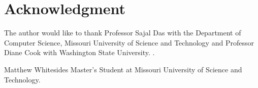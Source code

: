 \documentclass[journal,onecolumn]{IEEEtran}
\begin{document}


\section*{Acknowledgment}
The author would like to thank Professor Sajal Das with the Department of Computer Science, Missouri University of Science and Technology and Professor Diane Cook with Washington State University. .

\ifCLASSOPTIONcaptionsoff
  \newpage
\fi




\begin{IEEEbiographynophoto}{Matthew Whitesides}
  Master's Student at Missouri University of Science and Technology.
\end{IEEEbiographynophoto}

\end{document}
